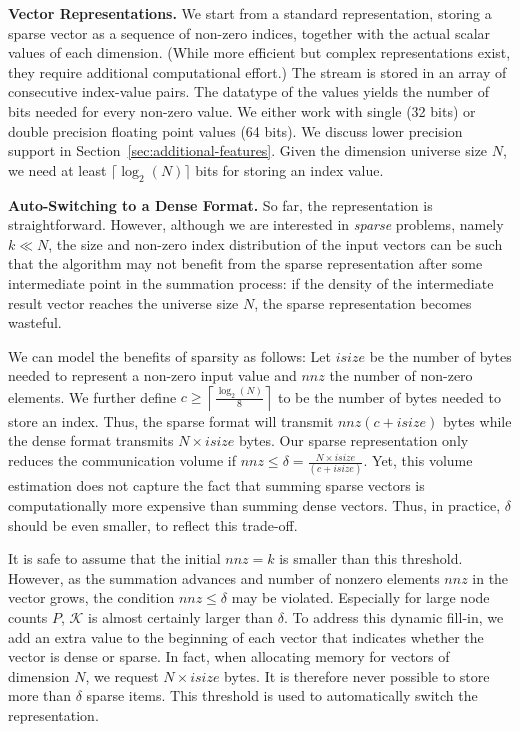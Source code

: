 \documentclass[11pt]{article}
\renewcommand{\paragraph}[1]{\vspace{0.1em} \noindent \textbf{#1}}
\begin{document}
\paragraph{Vector Representations.}
We start from a standard representation, storing a sparse vector as a
sequence of non-zero indices, together with the actual scalar values of
each dimension.  (While more efficient but complex representations
exist, they require additional computational effort.) The
stream is stored in an array of consecutive  index-value pairs.
The datatype of the values yields the number of bits needed
for every non-zero value. We either work with single (32 bits) or
double precision floating point values (64 bits). We discuss lower
precision support in Section~\ref{sec:additional-features}.  Given the
dimension universe size $N$, we need at least $\lceil\log_2(N)\rceil$
bits for storing an index value. 

\paragraph{Auto-Switching to a Dense Format.}
So far, the representation is straightforward. However, although we are
interested in \emph{sparse} problems, namely $k \ll N$, the size and
non-zero index distribution of the input vectors can be such that the
algorithm may not benefit from the sparse representation after some
intermediate point in the summation process: if the density of the
intermediate result vector reaches the universe size $N$, the sparse
representation becomes wasteful. 

We can model the benefits of sparsity as follows: Let $isize$ be the
number of bytes needed to represent a non-zero input value and $nnz$ the
number of non-zero elements. We further define $c\geq \left\lceil
\frac{\log_2(N)}{8} \right\rceil$ to be the number of bytes needed to
store an index. 
%
Thus, the sparse format will transmit $nnz (c+isize)$ bytes while the
dense format transmits $N\times isize$ bytes.
%
Our sparse representation only reduces the communication volume if $nnz \leq
\delta = \frac{N \times isize}{(c+isize)}$. Yet, this volume estimation does
not capture the fact that summing sparse vectors is computationally more
expensive than summing dense vectors. Thus, in practice, $\delta$ should
be even smaller, to reflect this trade-off.

It is safe to assume that the initial $nnz=k$ is smaller than this
threshold. However, as the summation advances and number of nonzero
elements $nnz$ in the vector grows, the condition $nnz \leq \delta$ may be
violated. Especially for large node counts $P$, $\mathcal{K}$ is almost
certainly larger than $\delta$. 
%
To address this dynamic fill-in, we add an extra value to the beginning
of each vector that indicates whether the vector is dense or sparse.
%
In fact, when allocating memory for vectors of dimension $N$, we request
$N \times isize$ bytes. It is therefore never possible to store more
than $\delta$ sparse items. This threshold is used to automatically
switch the representation.  
\end{document}
